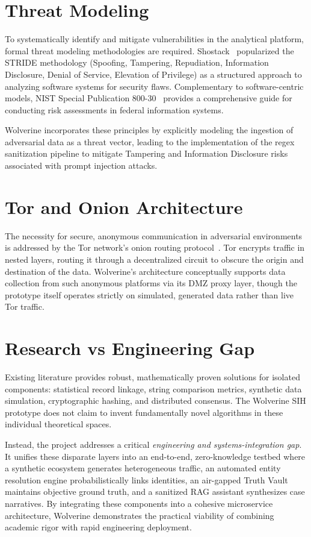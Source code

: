\section{Threat Modeling}
\label{sec:related-threat-modeling}
To systematically identify and mitigate vulnerabilities in the analytical platform, formal threat modeling methodologies are required. Shostack~\cite{shostack2014threat} popularized the STRIDE methodology (Spoofing, Tampering, Repudiation, Information Disclosure, Denial of Service, Elevation of Privilege) as a structured approach to analyzing software systems for security flaws. Complementary to software-centric models, NIST Special Publication 800-30~\cite{nist2012guide} provides a comprehensive guide for conducting risk assessments in federal information systems.

Wolverine incorporates these principles by explicitly modeling the ingestion of adversarial data as a threat vector, leading to the implementation of the regex sanitization pipeline to mitigate Tampering and Information Disclosure risks associated with prompt injection attacks.

\section{Tor and Onion Architecture}
\label{sec:related-tor}
The necessity for secure, anonymous communication in adversarial environments is addressed by the Tor network's onion routing protocol~\cite{dingledine2004tor}. Tor encrypts traffic in nested layers, routing it through a decentralized circuit to obscure the origin and destination of the data. Wolverine's architecture conceptually supports data collection from such anonymous platforms via its DMZ proxy layer, though the prototype itself operates strictly on simulated, generated data rather than live Tor traffic.

\section{Research vs Engineering Gap}
\label{sec:related-gaps}
Existing literature provides robust, mathematically proven solutions for isolated components: statistical record linkage, string comparison metrics, synthetic data simulation, cryptographic hashing, and distributed consensus. The Wolverine SIH prototype does not claim to invent fundamentally novel algorithms in these individual theoretical spaces. 

Instead, the project addresses a critical \textit{engineering and systems-integration gap}. It unifies these disparate layers into an end-to-end, zero-knowledge testbed where a synthetic ecosystem generates heterogeneous traffic, an automated entity resolution engine probabilistically links identities, an air-gapped Truth Vault maintains objective ground truth, and a sanitized RAG assistant synthesizes case narratives. By integrating these components into a cohesive microservice architecture, Wolverine demonstrates the practical viability of combining academic rigor with rapid engineering deployment.

